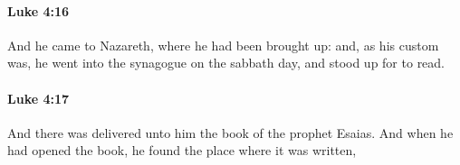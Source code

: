 		\paragraph{Luke 4:16} %
			\label{LUKE-4-16}

			And he came to Nazareth, where he had been brought up: and, as his custom was, he went into the synagogue on the sabbath day, and stood up for to read.

			\begin{framed}
			\scriptsize
				\begin{compactdesc}
					\item[SBLG] 
				\end{compactdesc}
			\end{framed}

		\paragraph{Luke 4:17} %
			\label{LUKE-4-17}

			And there was delivered unto him the book of the prophet Esaias. And when he had opened the book, he found the place where it was written,

